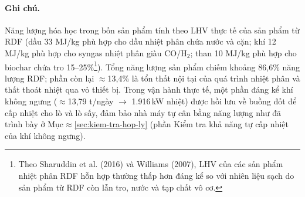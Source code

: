 \documentclass[../main.tex]{subfiles}
\begin{document}
\begin{table}[htbp]
\centering
\caption{Phân bổ năng lượng RDF sau nhiệt phân (Bảng 3.10)}
\label{tab:can-bang-nang-luong-so-bo}
\setlength{\tabcolsep}{5pt}
\paragraph*{Ghi chú.} Năng lượng hóa học trong bốn sản phẩm tính theo LHV thực tế của sản phẩm từ RDF (dầu 33 MJ/kg phù hợp cho dầu nhiệt phân chứa nước và cặn; khí 12 MJ/kg phù hợp cho syngas nhiệt phân giàu CO/H$_2$; than 10 MJ/kg phù hợp cho biochar chứa tro 15--25\%\footnote{Theo Sharuddin et al. (2016) và Williams (2007), LHV của các sản phẩm nhiệt phân RDF hỗn hợp thường thấp hơn đáng kể so với nhiên liệu sạch do sản phẩm từ RDF còn lẫn tro, nước và tạp chất vô cơ.}). Tổng năng lượng sản phẩm chiếm khoảng 86,6\% năng lượng RDF; phần còn lại $\approx$13,4\% là tổn thất nội tại của quá trình nhiệt phân và thất thoát nhiệt qua vỏ thiết bị. Trong vận hành thực tế, một phần đáng kể khí không ngưng ($\approx$13{,}79 t/ngày $\to$ 1.916\,kW nhiệt) được hồi lưu về buồng đốt để cấp nhiệt cho lò và lò sấy, đảm bảo nhà máy tự cân bằng năng lượng như đã trình bày ở Mục$\approx$\ref{sec:kiem-tra-hop-ly} (phần Kiểm tra khả năng tự cấp nhiệt của khí không ngưng).
\end{table}
\end{document}
